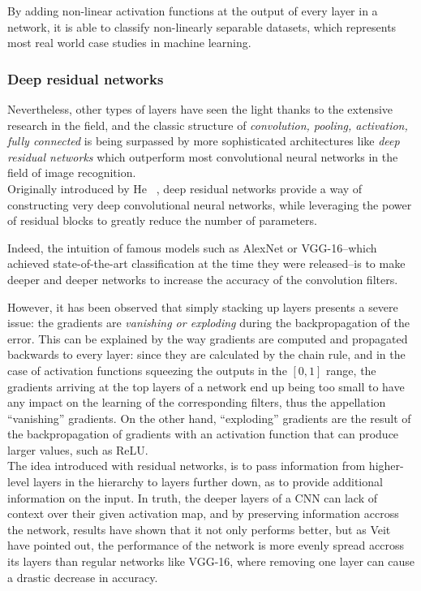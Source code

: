 By adding non-linear activation functions at the output of every layer in a
network, it is able to classify non-linearly separable datasets, which
represents most real world case studies in machine learning.\\


\subsubsection{Deep residual networks}

Nevertheless, other types of layers have seen the light thanks to the extensive
research in the field, and the classic structure of \emph{convolution, pooling,
activation, fully connected} is being surpassed by more sophisticated
architectures like \emph{deep residual networks} which outperform most
convolutional neural networks in the field of image recognition.\\

Originally introduced by He \etal~\cite{He_2016_CVPR}, deep residual networks
provide a way of constructing very deep convolutional neural networks, while
leveraging the power of residual blocks to greatly reduce the number of
parameters.

Indeed, the intuition of famous models such as AlexNet or VGG-16--which
achieved state-of-the-art classification at the time they were released--is to
make deeper and deeper networks to increase the accuracy of the convolution
filters.

However, it has been observed that simply stacking up layers presents a severe
issue: the gradients are \emph{vanishing or exploding} during the
backpropagation of the error. This can be explained by the way gradients are
computed and propagated backwards to every layer: since they are calculated by
the chain rule, and in the case of activation functions squeezing the outputs
in the $[0,1]$ range, the gradients arriving at the top layers of a network end
up being too small to have any impact on the learning of the corresponding
filters, thus the appellation ``vanishing'' gradients. On the other hand,
``exploding'' gradients are the result of the backpropagation of gradients
with an activation function that can produce larger values, such as ReLU.\\

The idea introduced with residual networks, is to pass information from
higher-level layers in the hierarchy to layers further down, as to provide
additional information on the input. In truth, the deeper layers of a CNN can
lack of context over their given activation map, and by preserving information
accross the network, results have shown that it not only performs better, but
as Veit \etal~\cite{ResnetBehavior} have pointed out, the performance of the
network is more evenly spread accross its layers than regular networks like
VGG-16, where removing one layer can cause a drastic decrease in accuracy.

